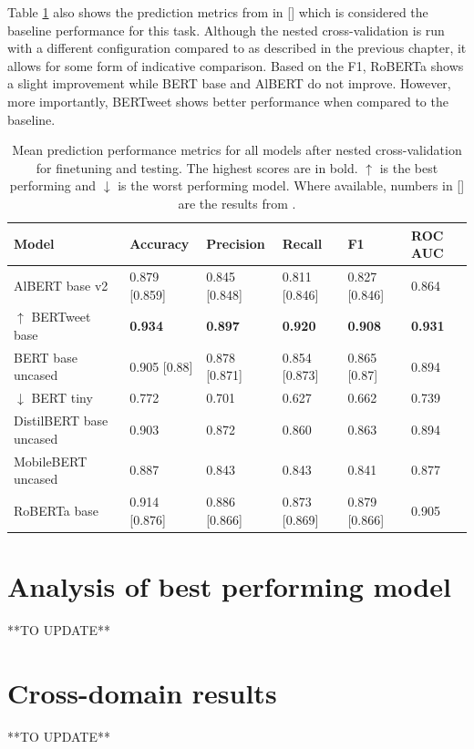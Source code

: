 Table \ref{tab: model_mean_metrics} also shows the prediction metrics from \cite{jin_complaint_2020} in [] which is considered the baseline performance for this task. Although the nested cross-validation is run with a different configuration compared to \cite{jin_complaint_2020} as described in the previous chapter, it allows for some form of indicative comparison. Based on the F1, RoBERTa shows a slight improvement while BERT base and AlBERT do not improve. However, more importantly, BERTweet shows better performance when compared to the baseline.
\begin{table}[htbp]
    \centering
    \small %
    \begin{tabularx}{\textwidth}{|X|X|X|X|X|X|}
        \hline
        \rowcolor[gray]{0.7}
        \textbf{Model}                         & \textbf{Accuracy} & \textbf{Precision} & \textbf{Recall} & \textbf{F1}    & \textbf{ROC AUC} \\
        \hline
        AlBERT base v2                         & 0.879 [0.859]     & 0.845 [0.848]      & 0.811 [0.846]   & 0.827 [0.846]  & 0.864            \\
        \rowcolor[gray]{0.9}
        \(\uparrow\) BERTweet base             & \textbf{0.934}    & \textbf{0.897}     & \textbf{0.920}  & \textbf{0.908} & \textbf{0.931}   \\
        BERT base uncased                      & 0.905 [0.88]      & 0.878  [0.871]     & 0.854  [0.873]  & 0.865 [0.87]   & 0.894            \\
        \rowcolor[gray]{0.9}
        \(\downarrow\) BERT tiny \vspace{10pt} & 0.772             & 0.701              & 0.627           & 0.662          & 0.739            \\
        DistilBERT base uncased                & 0.903             & 0.872              & 0.860           & 0.863          & 0.894            \\
        \rowcolor[gray]{0.9}
        MobileBERT uncased                     & 0.887             & 0.843              & 0.843           & 0.841          & 0.877            \\
        RoBERTa base                           & 0.914 [0.876]     & 0.886 [0.866]      & 0.873 [0.869]   & 0.879 [0.866]  & 0.905            \\
        \hline
    \end{tabularx}
    \caption{Mean prediction performance metrics for all models after nested cross-validation for finetuning and testing. The highest scores are in bold. \(\uparrow\) is the best performing and \(\downarrow\) is the worst performing model. Where available, numbers in [] are the results from \cite{jin_complaint_2020}.}
    \label{tab: model_mean_metrics}
\end{table}

\section{Analysis of best performing model}
**TO UPDATE**

\section{Cross-domain results}
**TO UPDATE**